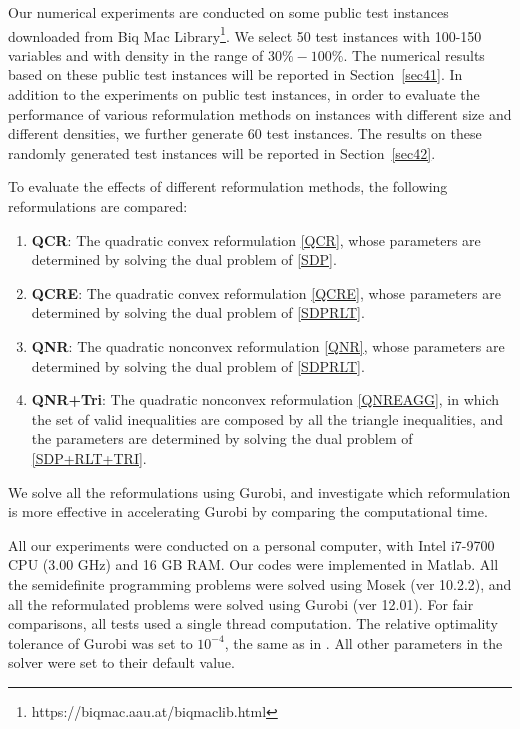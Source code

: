 \documentclass[pdflatex,sn-mathphys-num]{sn-jnl}%
\theoremstyle{thmstyleone}%
\theoremstyle{thmstyletwo}%
\theoremstyle{thmstylethree}%
\begin{document}
Our numerical experiments are conducted on some public test instances downloaded from Biq Mac Library\footnote{https://biqmac.aau.at/biqmaclib.html}. We select 50 test instances with 100-150 variables and with density in the range of $30\%-100\%$. The numerical results based on these public test instances will be reported in Section~\ref{sec41}. In addition to the experiments on public test instances, in order to evaluate the performance of various reformulation methods on instances with different size and different densities, we further generate 60 test instances. The results on these randomly generated test instances will be reported in Section~\ref{sec42}.

To evaluate the effects of different reformulation methods, the following reformulations are compared:
\begin{enumerate}
	\item[$\bullet$] \textbf{QCR}: The quadratic convex reformulation \eqref{QCR}, whose parameters are determined by solving the dual problem of \eqref{SDP}.
	\item[$\bullet$] \textbf{QCRE}: The quadratic convex reformulation \eqref{QCRE}, whose parameters are determined by solving the dual problem of \eqref{SDPRLT}.
	\item[$\bullet$] \textbf{QNR}: The quadratic nonconvex reformulation \eqref{QNR}, whose parameters are determined by solving the dual problem of \eqref{SDPRLT}.
	\item[$\bullet$] \textbf{QNR+Tri}: The quadratic nonconvex reformulation \eqref{QNREAGG}, in which the set of valid inequalities are composed by all the triangle inequalities, and the parameters are determined by solving the dual problem of \eqref{SDP+RLT+TRI}.
\end{enumerate}
We solve all the reformulations using Gurobi, and investigate which reformulation is more effective in accelerating Gurobi by comparing the computational time.

All our experiments were conducted on a personal computer, with Intel i7-9700 CPU (3.00 GHz) and 16 GB RAM. Our codes were implemented in Matlab. All the semidefinite programming problems were solved using Mosek (ver 10.2.2), and all the reformulated problems were solved using Gurobi (ver 12.01). For fair comparisons, all tests used a single thread computation. The relative optimality tolerance of Gurobi was set to $10^{-4}$, the same as in \cite{Locatelli2024}. All other parameters in the solver were set to their default value.
\end{document}

